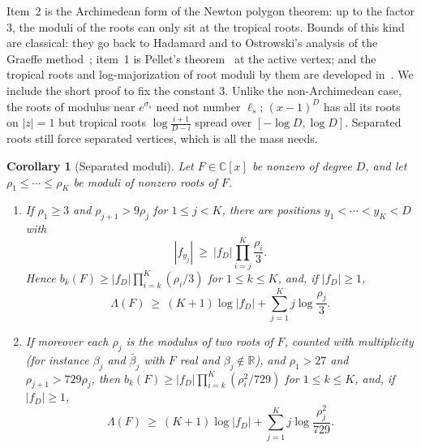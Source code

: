 \documentclass[11pt]{article}
\newtheorem{corollary}[theorem]{Corollary}
\newcommand{\R}{\mathbb R}
\begin{document}
Item~2 is the Archimedean form of the Newton polygon theorem: up to the
factor $3$, the moduli of the roots can only sit at the tropical roots.
Bounds of this kind are classical: they go back to Hadamard and to
Ostrowski's analysis of the Graeffe method~\cite{ostrowski}; item~1 is
Pellet's theorem~\cite{marden} at the active vertex; and the tropical roots
and log-majorization of root moduli by them are developed
in~\cite{akian-gaubert-sharify}.  We include the short proof to fix the
constant $3$.
Unlike the non-Archimedean case, the roots of modulus near $e^{\sigma_s}$ need not
number $\ell_s$; $(x-1)^D$ has all its roots on $|z|=1$ but
tropical roots $\log\frac{i+1}{D-i}$ spread over $[-\log D,\log D]$.
Separated roots still force separated vertices, which is all the mass needs.

\begin{corollary}[Separated moduli]\label{cor:separated}
Let $F\in\mathbb C[x]$ be nonzero of degree $D$, and let
$\rho_1\le\cdots\le\rho_K$ be moduli of nonzero roots of $F$.
\begin{enumerate}
\item If $\rho_1\ge3$ and $\rho_{j+1}>9\rho_j$ for $1\le j<K$, there are
positions $y_1<\cdots<y_K<D$ with
\[
  |f_{y_j}|\ \ge\ |f_D|\prod_{i=j}^K\frac{\rho_i}3 .
\]
Hence $b_k(F)\ge|f_D|\prod_{i=k}^K(\rho_i/3)$ for $1\le k\le K$, and, if
$|f_D|\ge1$,
\[
  \Lambda(F)\ \ge\ (K+1)\log|f_D|+\sum_{j=1}^Kj\log\frac{\rho_j}3 .
\]
\item If moreover each $\rho_j$ is the modulus of two roots of $F$, counted
with multiplicity (for instance $\beta_j$ and $\bar\beta_j$ with $F$ real and
$\beta_j\notin\R$), and $\rho_1>27$ and $\rho_{j+1}>729\rho_j$, then
$b_k(F)\ge|f_D|\prod_{i=k}^K(\rho_i^2/729)$ for $1\le k\le K$, and, if
$|f_D|\ge1$,
\[
  \Lambda(F)\ \ge\ (K+1)\log|f_D|+\sum_{j=1}^Kj\log\frac{\rho_j^2}{729} .
\]
\end{enumerate}
\end{corollary}
\end{document}
